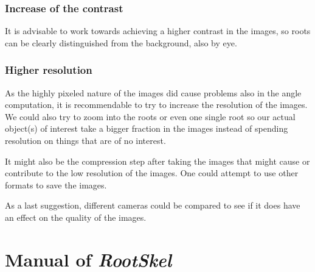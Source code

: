 

\subsection{Increase of the contrast}

It is advisable to work towards achieving a higher contrast in the images, so roots can be clearly distinguished from the background, also by eye.




\subsection{Higher resolution}


As the highly pixeled nature of the images did cause problems also in the angle computation, it is recommendable to try to increase the resolution of the images. We could also try to zoom into the roots or even one single root so our actual object(s) of interest take a bigger fraction in the images instead of spending resolution on things that are of no interest. 

It might also be the compression step after taking the images that might cause or contribute to the low resolution of the images. One could attempt to use other formats to save the images. 

As a last suggestion, different cameras could be compared to see if it does have an effect on the quality of the images. 




\chapter{Manual of \textit{RootSkel}}


